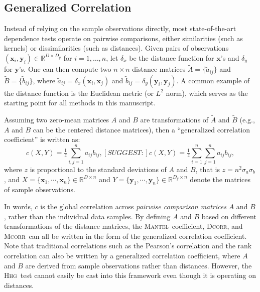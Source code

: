 \documentclass[11pt]{article}
\providecommand{\sct}[1]{{\normalfont\textsc{#1}}}
\providecommand{\mb}[1]{\boldsymbol{#1}}
\newcommand{\Real}{\mathbb{R}}
\newcommand{\GG}{c}
\newcommand{\Hhg}{\sct{Hhg}}
\newcommand{\Dcorr}{\sct{Dcorr}}
\newcommand{\Mcorr}{\sct{Mcorr}}
\newcommand{\Mantel}{\sct{Mantel}}
\begin{document}
\subsection{Generalized Correlation}
Instead of relying on the sample observations directly, most state-of-the-art dependence tests operate on pairwise comparisons, either similarities (such as kernels) or dissimilarities (such as distances). 
Given pairs of observations $(\mb{x}_{i},\mb{y}_{i}) \in \Real^{D \times D_y}$ for $i=1,\ldots,n$, let $\delta_x$ be the distance function for $\mb{x}$'s and $\delta_y$ for $\mb{y}$'s. One can then compute two $n \times n$ distance matrices $\tilde{A}=\{\tilde{a}_{ij}\}$ and $\tilde{B}=\{\tilde{b}_{ij}\}$, where $\tilde{a}_{ij}=\delta_x(\mb{x}_i,\mb{x}_j)$ and $\tilde{b}_{ij}=\delta_y(\mb{y}_i,\mb{y}_j)$. A common example of the distance function is the Euclidean metric (or $L^{2}$ norm), which serves as the starting point for all methods in this manuscript.

Assuming two zero-mean matrices $A$ and $B$ are transformations of $\tilde{A}$ and $\tilde{B}$ (e.g., $A$ and $B$ can be the centered distance matrices),
then a ``generalized correlation coefficient''  \cite{Spearman1904,KendallBook} is written as:
\begin{equation}
\label{generalCoef}
\GG(X,Y)= \tfrac{1}{z} {\textstyle \sum_{i,j=1}^n a_{ij} b_{ij}}, [SUGGEST:]
% 
% 
\GG(X,Y)= \tfrac{1}{z} {\textstyle \sum_{i=1}^n \sum_{j=1}^n a_{ij} b_{ij}},
\end{equation}
where $z$ is proportional to the standard deviations of $A$ and $B$, that is $z=n^2\sigma_a \sigma_b$, and $X=\{\mb{x}_{1},\cdots, \mb{x}_{n}\} \in \Real^{D \times n}$ and $Y=\{\mb{y}_{1},\cdots, \mb{y}_{n}\} \in \Real^{D_y \times n}$ denote the matrices of sample observations.

In words, $\GG$ is the global correlation across \emph{pairwise comparison matrices} $A$ and $B$, rather than the individual data samples. By defining $A$ and $B$ based on different transformations of 
the distance matrices, the \Mantel~coefficient, \Dcorr, and \Mcorr~can all be written in the form of the generalized correlation coefficient. Note that traditional correlations such as the Pearson's correlation and the rank correlation can also be written by a generalized correlation coefficient, where $A$ and $B$ are derived from sample observations rather than distances. However, the \Hhg~test  cannot easily be cast into this framework even though it is operating on distances.
\end{document}
